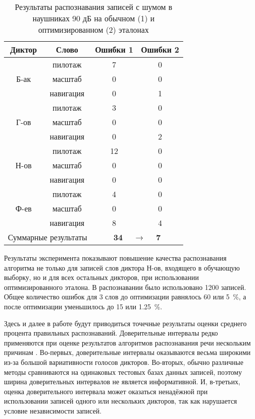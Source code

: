 \begin{table}[h]
	\centering
	\caption{Результаты распознавания записей с шумом в наушниках 90 дБ на обычном (1) и оптимизированном (2) эталонах}
	\label{tab:subsect3_3_3_tab2}
	\begin{tabular}{| c | c | c | c |}
		\hline
		\phantom{000} Диктор \phantom{000} & \phantom{000000} Слово \phantom{000000} & \phantom{000} Ошибки 1 \phantom{000} & \phantom{000} Ошибки 2 \phantom{000} \\
		\hline
				& пилотаж	& 7 & 0 \\
		Б-ак	& масштаб   & 0 & 0 \\
				& навигация & 0 & 1 \\
		\hline
				& пилотаж	& 3 & 0 \\
		Г-ов	& масштаб   & 0 & 0 \\
				& навигация & 0 & 2 \\
		\hline
				& пилотаж	& 12 & 0 \\
		Н-ов	& масштаб   & 0  & 0 \\
				& навигация & 0  & 0 \\
		\hline
				& пилотаж	& 4 & 0 \\
		Ф-ев	& масштаб   & 0 & 0 \\
				& навигация & 8 & 4 \\
		\hline
		\multicolumn{2}{|c|}{Суммарные результаты} & \multicolumn{2}{c|}{\textbf{34} $\quad\longrightarrow\quad$ \textbf{7}} \\
		\hline
	\end{tabular}
\end{table}

Результаты эксперимента показывают повышение качества распознавания алгоритма не только для записей слов диктора Н-ов, входящего в обучающую выборку, но и для всех остальных дикторов, при использовании оптимизированного эталона.
В распознавании было использовано 1200 записей.
Общее количество ошибок для 3 слов до оптимизации равнялось 60 или 5~\%, а после оптимизации уменьшилось до 15 или 1.25~\%.

Здесь и далее в работе будут приводиться точечные результаты оценки среднего процента правильных распознаваний.
Доверительные интервалы редко применяются при оценке результатов алгоритмов распознавания речи нескольким причинам \cite{karpov2012methodology}.
Во-первых, доверительные интервалы оказываются весьма широкими из-за большой вариативности голосов дикторов.
Во-вторых, обычно различные методы сравниваются на одинаковых тестовых базах данных записей, поэтому ширина доверительных интервалов не является информативной.
И, в-третьих, оценка доверительного интервала может оказаться ненадёжной при использовании записей одного или нескольких дикторов, так как нарушается условие независимости записей.

